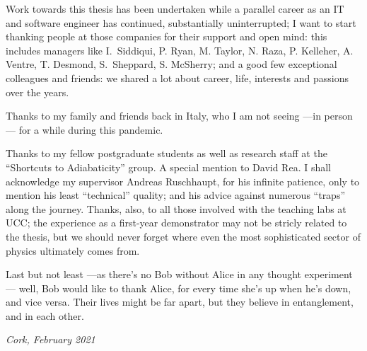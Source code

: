 {\small
  Work towards this thesis has been undertaken while a parallel career
  as an IT and software engineer has continued,
  substantially uninterrupted;
  I want to start thanking people at those companies for their support and open mind:
  this includes managers like
  I.~Siddiqui, P. Ryan, M. Taylor, N. Raza, P. Kelleher, A. Ventre, T. Desmond, S.~Sheppard, S. McSherry;
  and a good few exceptional colleagues and friends:
  we shared a lot about career, life, interests and passions over the years.

  Thanks to my family and friends back in Italy,
  who I am not seeing ---in person--- for a while during this pandemic.

  Thanks to my fellow postgraduate students
  as well as research staff
  at the ``Shortcuts to Adiabaticity'' group.
  A special mention to David Rea.
  I shall acknowledge my supervisor Andreas Ruschhaupt, for his infinite patience,
  only to mention his least ``technical'' quality;
  and his advice against numerous ``traps'' along the journey.
  Thanks, also, to all those involved with the teaching labs at UCC;
  the  experience as a  first-year demonstrator may not be stricly related to the thesis,
  but we should never forget where even the most sophisticated sector of physics
  ultimately comes from.

  Last but not least ---as there's no Bob without Alice in any thought experiment---
  well, Bob would like to thank Alice,
  for every time she’s up when he’s down, and vice versa.
  Their lives might be far apart, but they believe in entanglement, and in each other.

  \emph{Cork, February 2021}
}